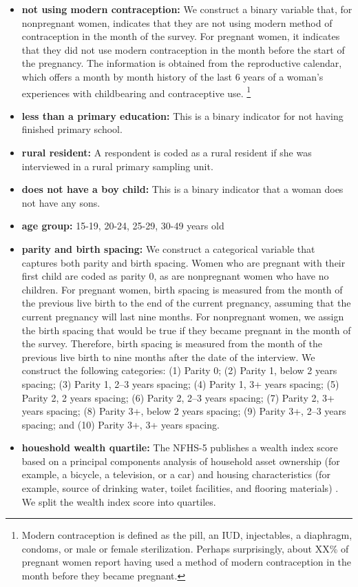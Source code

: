 \documentclass[12pt]{article}
\begin{document}
\begin{itemize}
\item {\bf{not using modern contraception:}} We construct a binary variable that, for nonpregnant women, indicates that they are not using modern method of contraception in the month of the survey.  For pregnant women, it indicates that they did not use modern contraception in the month before the start of the pregnancy.  The information is obtained from the reproductive calendar, which offers a month by month history of the last 6 years of a woman’s experiences with childbearing and contraceptive use. \footnote{Modern contraception is defined as the pill, an IUD, injectables, a diaphragm, condoms, or male or female sterilization.  Perhaps surprisingly, about XX\% of pregnant women report having used a method of modern contraception in the month before they became pregnant.} 
\item {\bf{less than a primary education:}} This is a binary indicator for not having finished primary school.
\item {\bf{rural resident:}} A respondent is coded as a rural resident if she was interviewed in a rural primary sampling unit. 
\item {\bf{does not have a boy child:}} This is a binary indicator that a woman does not have any sons.
\item {\bf{age group:}} 15-19, 20-24, 25-29, 30-49 years old
\item {\bf{parity and birth spacing:}} We construct a categorical variable that captures both parity and birth spacing. Women who are pregnant with their first child are coded as parity 0, as are nonpregnant women who have no children.  For pregnant women, birth spacing is measured from the month of the previous live birth to the end of the current pregnancy, assuming that the current pregnancy will last nine months. For nonpregnant women, we assign the birth spacing that would be true if they became pregnant in the month of the survey.  Therefore, birth spacing is measured from the month of the previous live birth to nine months after the date of the interview. 
We construct the following categories: (1) Parity 0; (2) Parity 1, below 2 years spacing; (3) Parity 1, 2–3 years spacing; (4) Parity 1, 3+ years spacing; (5) Parity 2, 2 years spacing; (6) Parity 2, 2–3 years spacing; (7) Parity 2, 3+ years spacing; (8) Parity 3+, below 2 years spacing; (9) Parity 3+, 2–3 years spacing; and (10) Parity 3+, 3+ years spacing.
\item {\bf{houeshold wealth quartile:}} The NFHS-5 publishes a wealth index score based on a principal components analysis of household asset ownership (for example, a bicycle, a television, or a car) and housing characteristics (for example, source of drinking water, toilet facilities, and flooring materials) \citep{iips_icf_nfhs5_2022}. We split the wealth index score into quartiles. 
\end{itemize}
\end{document}
